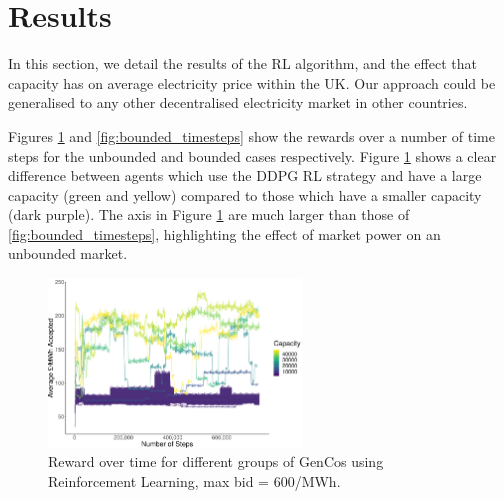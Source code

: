 






\section{Results}
\label{rl:sec:results}

In this section, we detail the results of the RL algorithm, and the effect that capacity has on average electricity price within the UK. Our approach could be generalised to any other decentralised electricity market in other countries. 

Figures \ref{fig:unbounded_timesteps} and \ref{fig:bounded_timesteps} show the rewards over a number of time steps for the unbounded and bounded cases respectively. Figure \ref{fig:unbounded_timesteps} shows a clear difference between agents which use the DDPG RL strategy and have a large capacity (green and yellow) compared to those which have a smaller capacity (dark purple). The axis in Figure \ref{fig:unbounded_timesteps} are much larger than those of \ref{fig:bounded_timesteps}, highlighting the effect of market power on an unbounded market.


\begin{figure}
	\centering
	\includegraphics[width=0.6\textwidth]{Chapter7/Figures/results/unbounded_results.pdf}
	\caption{Reward over time for different groups of GenCos using Reinforcement Learning, max bid = \textsterling $600$/MWh.}
	\label{fig:unbounded_timesteps}
\end{figure}

